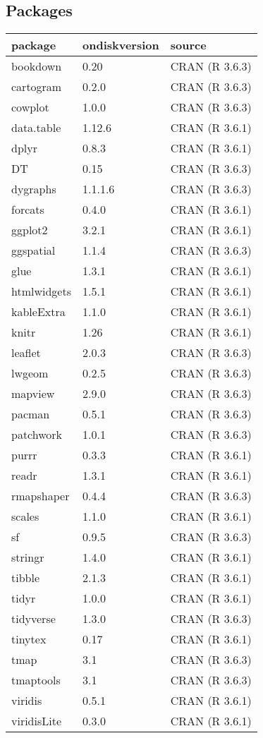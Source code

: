 \documentclass[
  french,
]{article}
\begin{document}
\hypertarget{packages}{%
\subsection*{Packages}\label{packages}}

\begin{table}[H]
\centering
\begin{tabular}{l|l|l}
\hline
package & ondiskversion & source\\
\hline
bookdown & 0.20 & CRAN (R 3.6.3)\\
\hline
cartogram & 0.2.0 & CRAN (R 3.6.3)\\
\hline
cowplot & 1.0.0 & CRAN (R 3.6.3)\\
\hline
data.table & 1.12.6 & CRAN (R 3.6.1)\\
\hline
dplyr & 0.8.3 & CRAN (R 3.6.1)\\
\hline
DT & 0.15 & CRAN (R 3.6.3)\\
\hline
dygraphs & 1.1.1.6 & CRAN (R 3.6.3)\\
\hline
forcats & 0.4.0 & CRAN (R 3.6.1)\\
\hline
ggplot2 & 3.2.1 & CRAN (R 3.6.1)\\
\hline
ggspatial & 1.1.4 & CRAN (R 3.6.3)\\
\hline
glue & 1.3.1 & CRAN (R 3.6.1)\\
\hline
htmlwidgets & 1.5.1 & CRAN (R 3.6.1)\\
\hline
kableExtra & 1.1.0 & CRAN (R 3.6.1)\\
\hline
knitr & 1.26 & CRAN (R 3.6.1)\\
\hline
leaflet & 2.0.3 & CRAN (R 3.6.3)\\
\hline
lwgeom & 0.2.5 & CRAN (R 3.6.3)\\
\hline
mapview & 2.9.0 & CRAN (R 3.6.3)\\
\hline
pacman & 0.5.1 & CRAN (R 3.6.3)\\
\hline
patchwork & 1.0.1 & CRAN (R 3.6.3)\\
\hline
purrr & 0.3.3 & CRAN (R 3.6.1)\\
\hline
readr & 1.3.1 & CRAN (R 3.6.1)\\
\hline
rmapshaper & 0.4.4 & CRAN (R 3.6.3)\\
\hline
scales & 1.1.0 & CRAN (R 3.6.1)\\
\hline
sf & 0.9.5 & CRAN (R 3.6.3)\\
\hline
stringr & 1.4.0 & CRAN (R 3.6.1)\\
\hline
tibble & 2.1.3 & CRAN (R 3.6.1)\\
\hline
tidyr & 1.0.0 & CRAN (R 3.6.1)\\
\hline
tidyverse & 1.3.0 & CRAN (R 3.6.3)\\
\hline
tinytex & 0.17 & CRAN (R 3.6.1)\\
\hline
tmap & 3.1 & CRAN (R 3.6.3)\\
\hline
tmaptools & 3.1 & CRAN (R 3.6.3)\\
\hline
viridis & 0.5.1 & CRAN (R 3.6.1)\\
\hline
viridisLite & 0.3.0 & CRAN (R 3.6.1)\\
\hline
\end{tabular}
\end{table}
\end{document}
